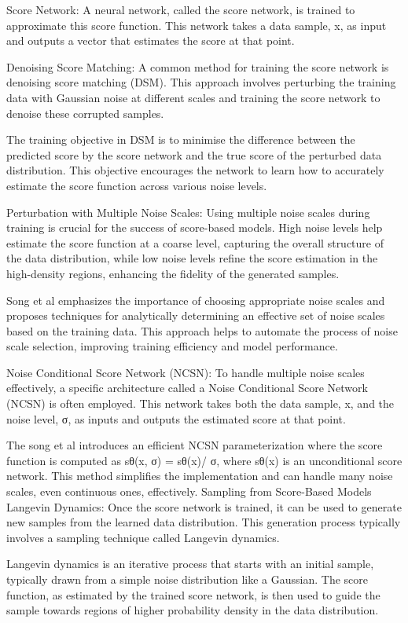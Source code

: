 \documentclass[
]{book}
\begin{document}
Score Network: A neural network, called the score network, is trained to approximate this score function. This network takes a data sample, x, as input and outputs a vector that estimates the score at that point.

Denoising Score Matching: A common method for training the score network is denoising score matching (DSM). This approach involves perturbing the training data with Gaussian noise at different scales and training the score network to denoise these corrupted samples.

The training objective in DSM is to minimise the difference between the predicted score by the score network and the true score of the perturbed data distribution. This objective encourages the network to learn how to accurately estimate the score function across various noise levels.

Perturbation with Multiple Noise Scales: Using multiple noise scales during training is crucial for the success of score-based models. High noise levels help estimate the score function at a coarse level, capturing the overall structure of the data distribution, while low noise levels refine the score estimation in the high-density regions, enhancing the fidelity of the generated samples.

Song et al emphasizes the importance of choosing appropriate noise scales and proposes techniques for analytically determining an effective set of noise scales based on the training data. This approach helps to automate the process of noise scale selection, improving training efficiency and model performance.

Noise Conditional Score Network (NCSN): To handle multiple noise scales effectively, a specific architecture called a Noise Conditional Score Network (NCSN) is often employed. This network takes both the data sample, x, and the noise level, σ, as inputs and outputs the estimated score at that point.

The song et al introduces an efficient NCSN parameterization where the score function is computed as sθ(x, σ) = sθ(x)/ σ, where sθ(x) is an unconditional score network. This method simplifies the implementation and can handle many noise scales, even continuous ones, effectively.
Sampling from Score-Based Models
Langevin Dynamics: Once the score network is trained, it can be used to generate new samples from the learned data distribution. This generation process typically involves a sampling technique called Langevin dynamics.

Langevin dynamics is an iterative process that starts with an initial sample, typically drawn from a simple noise distribution like a Gaussian. The score function, as estimated by the trained score network, is then used to guide the sample towards regions of higher probability density in the data distribution.
\end{document}
